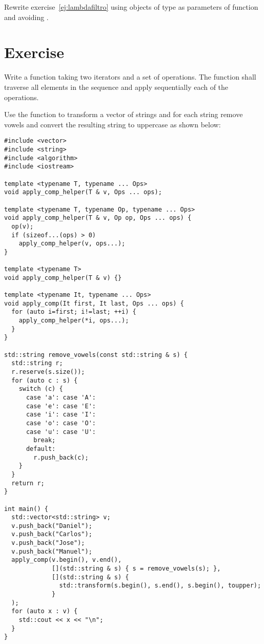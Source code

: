 Rewrite exercise~\ref{ej:lambdafiltro} using objects of
type  as parameters of function 
and avoiding .

\section{Exercise }

Write a function taking two iterators and a set of operations.
The function shall traverse all elements in the sequence and apply
sequentially each of the operations.

Use the function to transform a vector of strings and for each string
remove vowels and convert the resulting string to uppercase as shown below:

\begin{lstlisting}
#include <vector>
#include <string>
#include <algorithm>
#include <iostream>

template <typename T, typename ... Ops>
void apply_comp_helper(T & v, Ops ... ops);

template <typename T, typename Op, typename ... Ops>
void apply_comp_helper(T & v, Op op, Ops ... ops) {
  op(v);
  if (sizeof...(ops) > 0)
    apply_comp_helper(v, ops...);
}

template <typename T>
void apply_comp_helper(T & v) {}

template <typename It, typename ... Ops>
void apply_comp(It first, It last, Ops ... ops) {
  for (auto i=first; i!=last; ++i) {
    apply_comp_helper(*i, ops...);
  }
}

std::string remove_vowels(const std::string & s) {
  std::string r;
  r.reserve(s.size());
  for (auto c : s) {
    switch (c) {
      case 'a': case 'A':
      case 'e': case 'E':
      case 'i': case 'I':
      case 'o': case 'O':
      case 'u': case 'U':
        break;
      default:
        r.push_back(c);
    }
  }
  return r;
}

int main() {
  std::vector<std::string> v;
  v.push_back("Daniel");
  v.push_back("Carlos");
  v.push_back("Jose");
  v.push_back("Manuel");
  apply_comp(v.begin(), v.end(),
             [](std::string & s) { s = remove_vowels(s); },
             [](std::string & s) {
               std::transform(s.begin(), s.end(), s.begin(), toupper);
             }
  );
  for (auto x : v) {
    std::cout << x << "\n";
  }
}
\end{lstlisting}
